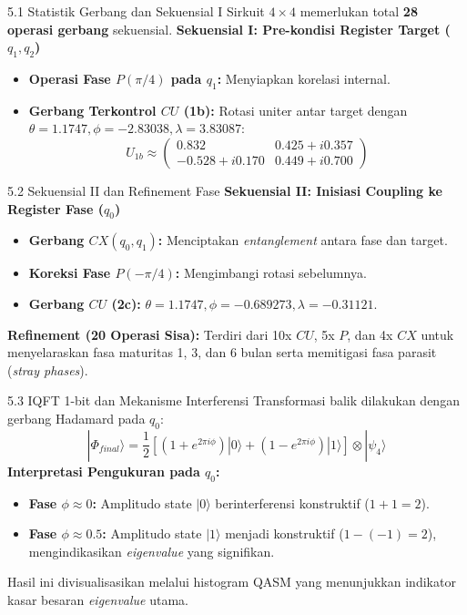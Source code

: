 \begin{frame}{5.1 Statistik Gerbang dan Sekuensial I}
    Sirkuit $4 \times 4$ memerlukan total \textbf{28 operasi gerbang} sekuensial.
    \textbf{Sekuensial I: Pre-kondisi Register Target ($q_1, q_2$)}
    \begin{itemize}
        \item \textbf{Operasi Fase $P(\pi/4)$ pada $q_1$:} Menyiapkan korelasi internal.
        \item \textbf{Gerbang Terkontrol $CU$ (1b):} Rotasi uniter antar target dengan $\theta=1.1747, \phi=-2.83038, \lambda=3.83087$:
        \begin{equation*}
            U_{1b} \approx \begin{pmatrix} 0.832 & 0.425 + i0.357 \\ -0.528 + i0.170 & 0.449 + i0.700 \end{pmatrix}
        \end{equation*}
    \end{itemize}
\end{frame}

\begin{frame}{5.2 Sekuensial II dan Refinement Fase}
    \textbf{Sekuensial II: Inisiasi Coupling ke Register Fase ($q_0$)}
    \begin{itemize}
        \item \textbf{Gerbang $CX(q_0, q_1)$:} Menciptakan \textit{entanglement} antara fase dan target.
        \item \textbf{Koreksi Fase $P(-\pi/4)$:} Mengimbangi rotasi sebelumnya.
        \item \textbf{Gerbang $CU$ (2c):} $\theta=1.1747, \phi=-0.689273, \lambda=-0.31121$.
    \end{itemize}
    \textbf{Refinement (20 Operasi Sisa):}
    Terdiri dari 10x $CU$, 5x $P$, dan 4x $CX$ untuk menyelaraskan fasa maturitas 1, 3, dan 6 bulan serta memitigasi fasa parasit (\textit{stray phases}).
\end{frame}

\begin{frame}{5.3 IQFT 1-bit dan Mekanisme Interferensi}
    Transformasi balik dilakukan dengan gerbang Hadamard pada $q_0$:
    \begin{equation}
        |\Phi_{final}\rangle = \frac{1}{2} \left[ (1 + e^{2\pi i \phi})|0\rangle + (1 - e^{2\pi i \phi})|1\rangle \right] \otimes |\psi_4\rangle
    \end{equation}
    \textbf{Interpretasi Pengukuran pada $q_0$:}
    \begin{itemize}
        \item \textbf{Fase $\phi \approx 0$:} Amplitudo state $|0\rangle$ berinterferensi konstruktif ($1+1=2$).
        \item \textbf{Fase $\phi \approx 0.5$:} Amplitudo state $|1\rangle$ menjadi konstruktif ($1 - (-1) = 2$), mengindikasikan \textit{eigenvalue} yang signifikan.
    \end{itemize}
    Hasil ini divisualisasikan melalui histogram QASM yang menunjukkan indikator kasar besaran \textit{eigenvalue} utama.
\end{frame}
